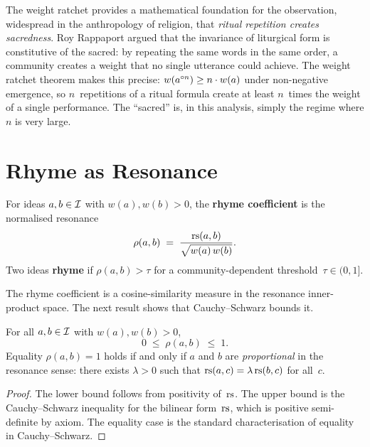 \begin{interpretation}
The weight ratchet provides a mathematical foundation for the
observation, widespread in the anthropology of religion, that
\emph{ritual repetition creates sacredness}.  Roy Rappaport
argued that the invariance of liturgical form is constitutive of the
sacred: by repeating the same words in the same order, a community
creates a weight that no single utterance could achieve.  The weight
ratchet theorem makes this precise: $w(a^{\circ n}) \ge n \cdot w(a)$
under non-negative emergence, so $n$~repetitions of a ritual formula
create at least $n$~times the weight of a single performance.  The
``sacred'' is, in this analysis, simply the regime where $n$ is very large.
\end{interpretation}

\section{Rhyme as Resonance}
\label{sec:rhyme}

\begin{definition}
\label{def:rhyme}
For ideas $a,b \in \mathcal{I}$ with $w(a), w(b) > 0$, the
\textbf{rhyme coefficient} is the normalised resonance
\[
  \rho(a,b) \;=\;
  \frac{\mathrm{rs}(a,b)}{\sqrt{w(a)\,w(b)}}.
\]
Two ideas \textbf{rhyme} if $\rho(a,b) > \tau$ for a
community-dependent threshold~$\tau \in (0,1]$.
\end{definition}

The rhyme coefficient is a cosine-similarity measure in the
resonance inner-product space.  The next result shows that
Cauchy--Schwarz bounds it.

\begin{proposition}
\label{prop:cs-rhyme}
For all $a,b \in \mathcal{I}$ with $w(a),w(b)>0$,
\[
  0 \;\le\; \rho(a,b) \;\le\; 1.
\]
Equality $\rho(a,b)=1$ holds if and only if $a$ and $b$ are
\emph{proportional} in the resonance sense: there exists
$\lambda > 0$ such that $\mathrm{rs}(a,c) = \lambda\,\mathrm{rs}(b,c)$ for all~$c$.
\end{proposition}

\begin{proof}
The lower bound follows from positivity of~$\mathrm{rs}$.  The upper bound
is the Cauchy--Schwarz inequality for the bilinear form~$\mathrm{rs}$,
which is positive semi-definite by axiom.  The equality case is the
standard characterisation of equality in Cauchy--Schwarz.
\end{proof}

